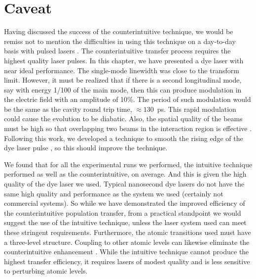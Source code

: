 \section{Caveat}
\hspace{\parindent}  Having discussed the success of the counterintuitive
technique, we would be remiss not to mention the difficulties in using this
technique on a day-to-day basis with pulsed lasers \cite{Bergmann_caveat}.  The
counterintuitive transfer process requires the highest quality laser pulses.  In
this chapter, we have presented a dye laser with near ideal performance.  The
single-mode linewidth was close to the transform limit.  However, it must be
realized that if there is a second longitudinal mode, say with energy 1/100 of
the main mode, then this can produce modulation in the electric field with an
amplitude of 10\%.  The period of such modulation would be the same as the
cavity round trip time, $\approx 130$~ps.  This rapid modulation could cause the
evolution to be diabatic. Also, the spatial quality of the beams must be high
so that overlapping two beams in the interaction region is effective
\cite{Bergmann_caveat}.  Following this work, we developed a technique to smooth
the rising edge of the dye laser pulse \cite{Corless:97}, so this should improve
the technique.

We found that for all the experimental runs we performed, the intuitive
technique performed as well as the counterintuitive, on average.  And this is
given the high quality of the dye laser we used.  Typical nanosecond dye lasers
do not have the same high quality and performance as the system we used
(certainly not commercial systems).  So while we have demonstrated the improved
efficiency of the counterintuitive population transfer, from a practical
standpoint we would suggest the use of the intuitive technique, unless the
laser system used can meet these stringent requirements.  Furthermore, the
atomic transitions used must have a three-level structure.  Coupling
to other atomic levels can likewise eliminate the counterintuitive enhancement
\cite{Martin:95}.  While the intuitive technique cannot produce the highest
transfer efficiency, it requires lasers of modest quality and is less sensitive
to perturbing atomic levels.

